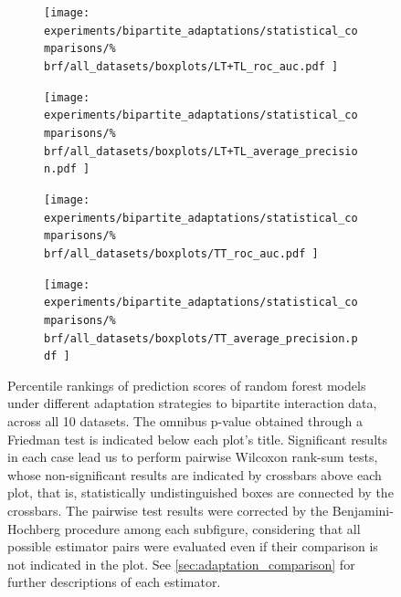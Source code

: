 \begin{figure}[tbh]
    \centering
    \begin{subfigure}{0.49\textwidth}
        \texttt{[image: 
            experiments/bipartite\_adaptations/statistical\_comparisons/\%
            brf/all\_datasets/boxplots/LT+TL\_roc\_auc.pdf
        ]}
    \end{subfigure}
    \begin{subfigure}{0.49\textwidth}
        \texttt{[image: 
            experiments/bipartite\_adaptations/statistical\_comparisons/\%
            brf/all\_datasets/boxplots/LT+TL\_average\_precision.pdf
        ]}
    \end{subfigure}

    \begin{subfigure}{0.49\textwidth}
        \texttt{[image: 
            experiments/bipartite\_adaptations/statistical\_comparisons/\%
            brf/all\_datasets/boxplots/TT\_roc\_auc.pdf
        ]}
    \end{subfigure}
    \begin{subfigure}{0.49\textwidth}
        \texttt{[image: 
            experiments/bipartite\_adaptations/statistical\_comparisons/\%
            brf/all\_datasets/boxplots/TT\_average\_precision.pdf
        ]}
    \end{subfigure}
    \caption{
        Percentile rankings of prediction scores of random forest models under different adaptation strategies to bipartite interaction data, across all 10 datasets.
        The omnibus p-value obtained through a Friedman test is indicated below each plot's title. Significant results in each case lead us to perform pairwise Wilcoxon rank-sum tests, whose non-significant results are indicated by crossbars above each plot, that is, statistically undistinguished boxes are connected by the crossbars. The pairwise test results were corrected by the Benjamini-Hochberg procedure among each subfigure, considering that all possible estimator pairs were evaluated even if their comparison is not indicated in the plot. See \autoref{sec:adaptation_comparison} for further descriptions of each estimator.
    }
    \label{fig:adaptations_brf}
\end{figure}


